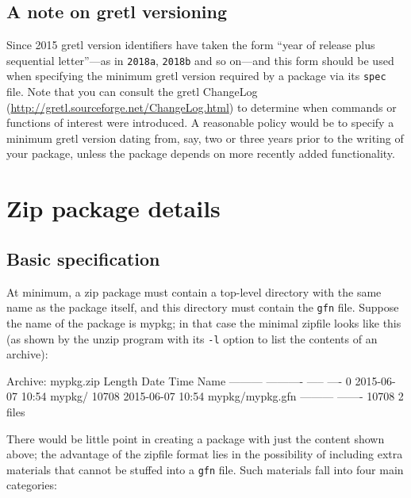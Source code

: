 \documentclass[oneside]{book}
\begin{document}

\section{A note on gretl versioning}
\label{sec:versioning}

Since 2015 gretl version identifiers have taken the form ``year of
release plus sequential letter''---as in \texttt{2018a},
\texttt{2018b} and so on---and this form should be used when
specifying the minimum gretl version required by a package via its
\texttt{spec} file. Note that you can consult the gretl ChangeLog
(\url{http://gretl.sourceforge.net/ChangeLog.html}) to determine when
commands or functions of interest were introduced. A reasonable policy
would be to specify a minimum gretl version dating from, say, two or
three years prior to the writing of your package, unless the package
depends on more recently added functionality.

\chapter{Zip package details}
\label{chap:zipfile}

\section{Basic specification}

At minimum, a zip package must contain a top-level directory with the
same name as the package itself, and this directory must contain the
\texttt{gfn} file. Suppose the name of the package is \textsf{mypkg};
in that case the minimal zipfile looks like this (as shown by the
\textsf{unzip} program with its \texttt{-l} option to list the
contents of an archive):
%
\begin{code}
Archive:  mypkg.zip
  Length      Date    Time    Name
---------  ---------- -----   ----
        0  2015-06-07 10:54   mypkg/
    10708  2015-06-07 10:54   mypkg/mypkg.gfn
---------                     -------
    10708                     2 files
\end{code}

There would be little point in creating a package with just the
content shown above; the advantage of the zipfile format lies in the
possibility of including extra materials that cannot be stuffed into
a \texttt{gfn} file. Such materials fall into four main categories:
\end{document}

